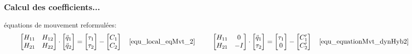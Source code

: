 \documentclass[10pt]{beamer}
\begin{document}
\begin{frame}
  \frametitle{Calcul des coefficients...}
  
  	\begin{block}{\footnotesize{équations de mouvement reformulées:}}\footnotesize
  	\setlength\abovedisplayskip{0pt}
  	\setlength\belowdisplayskip{0pt}
  \begin{align*}
  	\begin{bmatrix}
	  H_{11} & H_{12} \\
	  H_{21} & H_{22}
	\end{bmatrix} 
	\cdot
	\begin{bmatrix}
	  \ddot{q}_{1} \\
	  \ddot{q}_{2}
	\end{bmatrix} 
	= 
	\begin{bmatrix}
	  \tau_{1} \\
	  \tau_{2}
	\end{bmatrix} 
	-
	\begin{bmatrix}
	  C_{1} \\
	  C_{2}
	\end{bmatrix} \quad \eqref{equ_local_eqMvt_2} \hspace{.85cm}
	\begin{bmatrix}
	  H_{11} & 0 \\
	  H_{21} &  -I
	\end{bmatrix} 
	\cdot
	\begin{bmatrix}
	  \ddot{q}_1 \\
	  \tau_2
	\end{bmatrix} 
	=
	\begin{bmatrix}
	  \tau_1 \\
	  0
	\end{bmatrix} 
	-
	\begin{bmatrix}
	  C'_{1} \\
	  C'_{2}
	\end{bmatrix} \quad \eqref{equ_equationMvt_dynHyb2} \\
	\end{align*}
  \end{block}
  

\end{frame}
\end{document}
